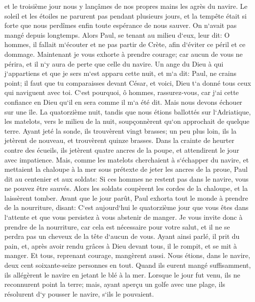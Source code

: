 \verse et le troisième jour nous y lançâmes de nos propres mains les agrès du navire. 
\verse Le soleil et les étoiles ne parurent pas pendant plusieurs jours, et la tempête était si forte que nous perdîmes enfin toute espérance de nous sauver. 
\verse On n`avait pas mangé depuis longtemps. Alors Paul, se tenant au milieu d`eux, leur dit: O hommes, il fallait m`écouter et ne pas partir de Crète, afin d`éviter ce péril et ce dommage. 
\verse Maintenant je vous exhorte à prendre courage; car aucun de vous ne périra, et il n`y aura de perte que celle du navire. 
\verse Un ange du Dieu à qui j`appartiens et que je sers m`est apparu cette nuit, 
\verse et m`a dit: Paul, ne crains point; il faut que tu comparaisses devant César, et voici, Dieu t`a donné tous ceux qui naviguent avec toi. 
\verse C`est pourquoi, ô hommes, rassurez-vous, car j`ai cette confiance en Dieu qu`il en sera comme il m`a été dit. 
\verse Mais nous devons échouer sur une île. 
\verse La quatorzième nuit, tandis que nous étions ballottés sur l`Adriatique, les matelots, vers le milieu de la nuit, soupçonnèrent qu`on approchait de quelque terre. 
\verse Ayant jeté la sonde, ils trouvèrent vingt brasses; un peu plus loin, ils la jetèrent de nouveau, et trouvèrent quinze brasses. 
\verse Dans la crainte de heurter contre des écueils, ils jetèrent quatre ancres de la poupe, et attendirent le jour avec impatience. 
\verse Mais, comme les matelots cherchaient à s`échapper du navire, et mettaient la chaloupe à la mer sous prétexte de jeter les ancres de la proue, 
\verse Paul dit au centenier et aux soldats: Si ces hommes ne restent pas dans le navire, vous ne pouvez être sauvés. 
\verse Alors les soldats coupèrent les cordes de la chaloupe, et la laissèrent tomber. 
\verse Avant que le jour parût, Paul exhorta tout le monde à prendre de la nourriture, disant: C`est aujourd`hui le quatorzième jour que vous êtes dans l`attente et que vous persistez à vous abstenir de manger. 
\verse Je vous invite donc à prendre de la nourriture, car cela est nécessaire pour votre salut, et il ne se perdra pas un cheveux de la tête d`aucun de vous. 
\verse Ayant ainsi parlé, il prit du pain, et, après avoir rendu grâces à Dieu devant tous, il le rompit, et se mit à manger. 
\verse Et tous, reprenant courage, mangèrent aussi. 
\verse Nous étions, dans le navire, deux cent soixante-seize personnes en tout. 
\verse Quand ils eurent mangé suffisamment, ils allégèrent le navire en jetant le blé à la mer. 
\verse Lorsque le jour fut venu, ils ne reconnurent point la terre; mais, ayant aperçu un golfe avec une plage, ils résolurent d`y pousser le navire, s`ils le pouvaient. 
